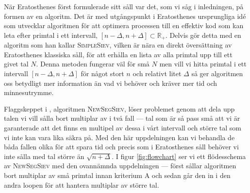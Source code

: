 


När Eratosthenes först formulerade sitt såll var det, som vi såg i inledningen, på formen av en algoritm. Det är med utgångspunkt i Eratosthenes ursprungliga idé som \cite{HaraldSieve} utvecklar algoritmen för att optimera processen till en effektiv kod som kan leta efter primtal i ett intervall, $[n - \Delta, n + \Delta] \subset \mathbb{R}_+$. Delvis gör \cite{HaraldSieve} detta med en algoritm som han kallar \textsc{SimpleSiev}, vilken är nära en direkt översättning av Eratosthenes klassiska såll, för att erhålla en lista av alla primtal upp till ett givet tal $N$. Denna metoden fungerar väl för små $N$ men vill vi hitta primtal i ett intervall $[n - \Delta, n + \Delta]$ för något stort $n$ och relativt litet $\Delta$ så ger algoritmen oss betydligt mer information än vad vi behöver och kräver mer tid och minnesutrymme. 

Flaggskeppet i \cite{HaraldSieve}, algoritmen \textsc{NewSegSiev}, löser problemet genom att dela upp talen vi vill sålla bort multiplar av i två fall --- tal som är så pass små att vi är garanterade att det finns en multipel av dessa i vårt intervall och större tal som vi inte kan vara lika säkra på. Med den här uppdelningen kan vi behandla de båda fallen olika för att spara tid och precis som i Eratosthenes såll behöver vi inte sålla med tal större än \(\sqrt{n + \Delta}\). I figur \ref{fig:flowchart} ser vi ett flödesschema av \textsc{NewSegSiev} med den ovannämnda uppdelningen --- först sållar algoritmen bort multiplar av små primtal innan kriterium A och sedan går den in i den andra loopen för att hantera multiplar av större tal. 

